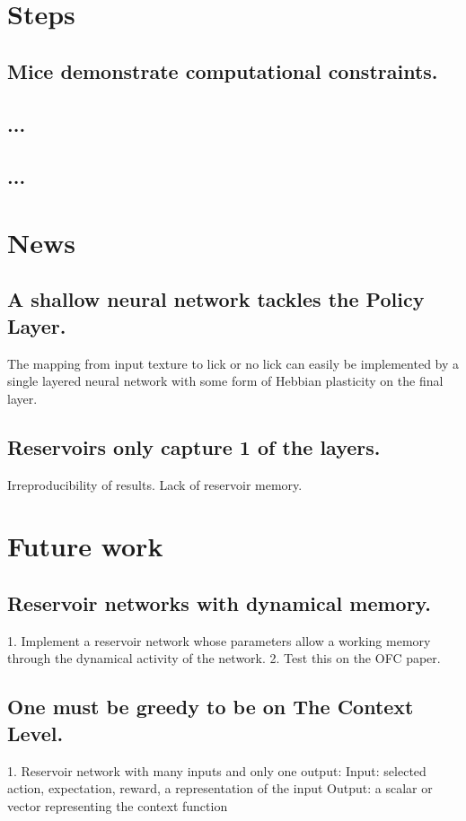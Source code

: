 \documentclass[]{article}
\begin{document}
\section{Steps}

\subsection{Mice demonstrate computational constraints.}

\subsection{...}

\subsection{...}

\section{News}

\subsection{A shallow neural network tackles the Policy Layer.}
The mapping from input texture to lick or no lick can easily be implemented by a single layered neural network with some form of Hebbian plasticity on the final layer.

\subsection{Reservoirs only capture 1 of the layers.}
Irreproducibility of results.
Lack of reservoir memory.

\section{Future work}

\subsection{Reservoir networks with dynamical memory.}
1. Implement a reservoir network whose parameters allow a working memory through the dynamical activity of the network.
2. Test this on the OFC paper.

\subsection{One must be greedy to be on The Context Level.}
1. Reservoir network with many inputs and only one output:
Input: selected action, expectation, reward, a representation of the input
Output: a scalar or vector representing the context function
\end{document}
